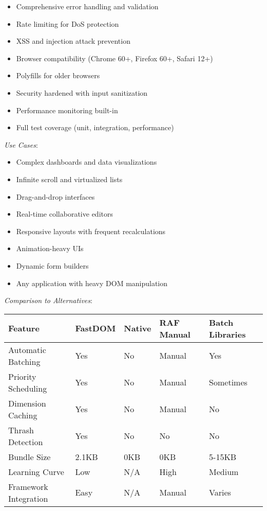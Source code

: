 \documentclass[11pt]{article}
\begin{document}
\begin{itemize}
\item Comprehensive error handling and validation
\item Rate limiting for DoS protection
\item XSS and injection attack prevention
\item Browser compatibility (Chrome 60+, Firefox 60+, Safari 12+)
\item Polyfills for older browsers
\item Security hardened with input sanitization
\item Performance monitoring built-in
\item Full test coverage (unit, integration, performance)
\end{itemize}

\emph{Use Cases}:

\begin{itemize}
\item Complex dashboards and data visualizations
\item Infinite scroll and virtualized lists
\item Drag-and-drop interfaces
\item Real-time collaborative editors
\item Responsive layouts with frequent recalculations
\item Animation-heavy UIs
\item Dynamic form builders
\item Any application with heavy DOM manipulation
\end{itemize}

\emph{Comparison to Alternatives}:

\begin{center}
\begin{tabular}{lllll}
Feature & FastDOM & Native & RAF Manual & Batch Libraries\\
\hline
Automatic Batching & Yes & No & Manual & Yes\\
Priority Scheduling & Yes & No & Manual & Sometimes\\
Dimension Caching & Yes & No & Manual & No\\
Thrash Detection & Yes & No & No & No\\
Bundle Size & 2.1KB & 0KB & 0KB & 5-15KB\\
Learning Curve & Low & N/A & High & Medium\\
Framework Integration & Easy & N/A & Manual & Varies\\
\end{tabular}
\end{center}
\end{document}
